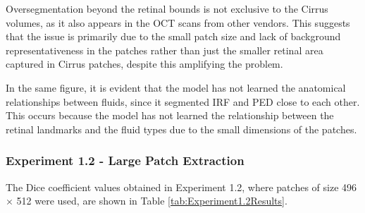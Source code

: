 Oversegmentation beyond the retinal bounds is not exclusive to the Cirrus volumes, as it also appears in the OCT scans from other vendors. This suggests that the issue is primarily due to the small patch size and lack of background representativeness in the patches rather than just the smaller retinal area captured in Cirrus patches, despite this amplifying the problem. 
\par
In the same figure, it is evident that the model has not learned the anatomical relationships between fluids, since it segmented IRF and PED close to each other. This occurs because the model has not learned the relationship between the retinal landmarks and the fluid types due to the small dimensions of the patches.

\subsubsection{Experiment 1.2 - Large Patch Extraction}

The Dice coefficient values obtained in Experiment 1.2, where patches of size 496 $\times$ 512 were used, are shown in Table \ref{tab:Experiment1.2Results}.


